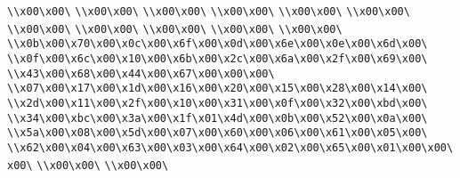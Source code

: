 \verb|\\x00\x00\|\newline
\verb|\\x00\x00\|\newline
\verb|\\x00\x00\|\newline
\verb|\\x00\x00\|\newline
\verb|\\x00\x00\|\newline
\verb|\\x00\x00\|\newline
\verb|\\x00\x00\|\newline
\verb|\\x00\x00\|\newline
\verb|\\x00\x00\|\newline
\verb|\\x00\x00\|\newline
\verb|\\x00\x00\|\newline
\verb|\\x0b\x00\x70\x00\x0c\x00\x6f\x00\x0d\x00\x6e\x00\x0e\x00\x6d\x00\|\newline
\verb|\\x0f\x00\x6c\x00\x10\x00\x6b\x00\x2c\x00\x6a\x00\x2f\x00\x69\x00\|\newline
\verb|\\x43\x00\x68\x00\x44\x00\x67\x00\x00\x00\|\newline
\verb|\\x07\x00\x17\x00\x1d\x00\x16\x00\x20\x00\x15\x00\x28\x00\x14\x00\|\newline
\verb|\\x2d\x00\x11\x00\x2f\x00\x10\x00\x31\x00\x0f\x00\x32\x00\xbd\x00\|\newline
\verb|\\x34\x00\xbc\x00\x3a\x00\x1f\x01\x4d\x00\x0b\x00\x52\x00\x0a\x00\|\newline
\verb|\\x5a\x00\x08\x00\x5d\x00\x07\x00\x60\x00\x06\x00\x61\x00\x05\x00\|\newline
\verb|\\x62\x00\x04\x00\x63\x00\x03\x00\x64\x00\x02\x00\x65\x00\x01\x00\x00\x00\|\newline
\verb|\\x00\x00\|\newline
\verb|\\x00\x00\|\newline
